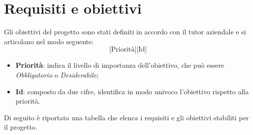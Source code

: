 \section{Requisiti e obiettivi}

Gli obiettivi del progetto sono stati definiti in accordo con il tutor aziendale e si articolano nel modo seguente:
\[
    \text{[Priorità][Id]}
\]
\begin{itemize}
    \item \textbf{Priorità}: indica il livello di importanza dell'obiettivo, che può essere \emph{Obbligatorio} o \emph{Desiderabile};
    \item \textbf{Id}: composto da due cifre, identifica in modo univoco l'obiettivo rispetto alla priorità.
\end{itemize}

Di seguito è riportata una tabella che elenca i requisiti e gli obiettivi stabiliti per il progetto.

